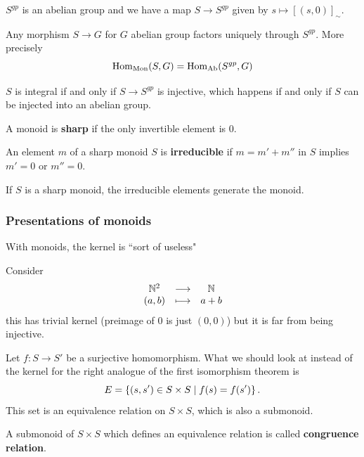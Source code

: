 \begin{remark}
$S^{gp}$ is an abelian group and we have a map $S\to S^{gp}$ given by $s\mapsto [(s,0)]_\sim$.
\end{remark}


\begin{fact}
Any morphism $S\to G$ for $G$ abelian group factors uniquely through $S^{gp}$. More precisely
\[\operatorname{Hom}_{\text{Mon}}(S,G)=\operatorname{Hom}_{\text{Ab}}(S^{gp},G)\]
\end{fact}


\begin{remark}
$S$ is integral if and only if $S\to S^{gp}$ is injective, which happens if and only if $S$ can be injected into an abelian group.
\end{remark}


\begin{definition}[]
A monoid is \textbf{sharp} if the only invertible element is $0$.
\end{definition}

\begin{definition}[]
An element $m$ of a sharp monoid $S$ is \textbf{irreducible} if $m=m'+m''$ in $S$ implies $m'=0$ or $m''=0$.
\end{definition}
\begin{remark}\label{ReIrreducibleGenerateForSharpMonoid}
If $S$ is a sharp monoid, the irreducible elements generate the monoid.
\end{remark}

\subsubsection{Presentations of monoids}
With monoids, the kernel is ``sort of useless"
\begin{example}
Consider
\[\begin{array}{ccc} {\mathbb{N}^2} & \longrightarrow & {\mathbb{N}}\\ {(a,b)} & \longmapsto & {a+b} \end{array}\]
this has trivial kernel (preimage of $0$ is just $(0,0)$) but it is far from being injective.
\end{example}

Let $f:S\to S'$ be a surjective homomorphism. What we should look at instead of the kernel for the right analogue of the first isomorphism theorem is
\[E=\left\{{(s,s')\in S\times S\mid f(s)=f(s')}\right\}.\]
This set is an equivalence relation on $S\times S$, which is also a submonoid.

\begin{definition}
A submonoid of $S\times S$ which defines an equivalence relation is called \textbf{congruence relation}.
\end{definition}

